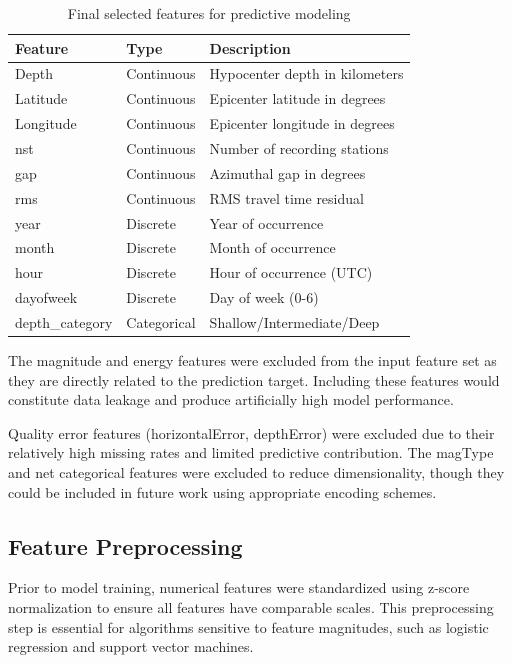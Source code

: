 \begin{table}[H]
\centering
\caption{Final selected features for predictive modeling}
\begin{tabular}{|l|l|l|}
\hline
\textbf{Feature} & \textbf{Type} & \textbf{Description} \\
\hline
Depth & Continuous & Hypocenter depth in kilometers \\
Latitude & Continuous & Epicenter latitude in degrees \\
Longitude & Continuous & Epicenter longitude in degrees \\
nst & Continuous & Number of recording stations \\
gap & Continuous & Azimuthal gap in degrees \\
rms & Continuous & RMS travel time residual \\
year & Discrete & Year of occurrence \\
month & Discrete & Month of occurrence \\
hour & Discrete & Hour of occurrence (UTC) \\
dayofweek & Discrete & Day of week (0-6) \\
depth\_category & Categorical & Shallow/Intermediate/Deep \\
\hline
\end{tabular}
\end{table}

The magnitude and energy features were excluded from the input feature set as they are directly related to the prediction target. Including these features would constitute data leakage and produce artificially high model performance.

Quality error features (horizontalError, depthError) were excluded due to their relatively high missing rates and limited predictive contribution. The magType and net categorical features were excluded to reduce dimensionality, though they could be included in future work using appropriate encoding schemes.

\subsection{Feature Preprocessing}

Prior to model training, numerical features were standardized using z-score normalization to ensure all features have comparable scales. This preprocessing step is essential for algorithms sensitive to feature magnitudes, such as logistic regression and support vector machines.

